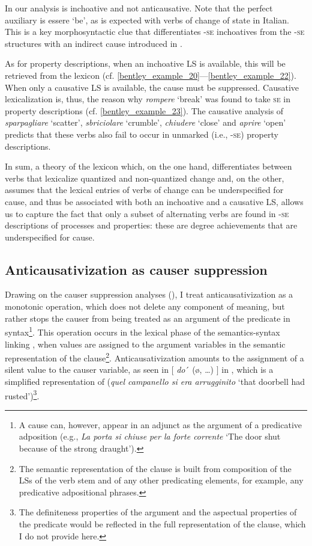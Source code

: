 \documentclass[output=paper,colorlinks,citecolor=brown
]{langscibook}
\begin{document}
In our analysis  is inchoative and not anticausative. Note that the perfect auxiliary is essere ‘be’, as is expected with verbs of change of state in Italian. This is a key morphosyntactic clue that differentiates -\textsc{se} inchoatives from the -\textsc{se} structures with an indirect cause introduced in . 

As for property descriptions, when an inchoative LS is available, this will be retrieved from the
lexicon (cf. \ref{bentley_example_20}—\ref{bentley_example_22}). When only a causative LS is available, the cause must be suppressed. Causative lexicalization is, thus, the reason why \textit{rompere} ‘break’ was found to take \textsc{se} in property descriptions (cf. \ref{bentley_example_23}). The causative analysis of \textit{sparpagliare} ‘scatter’, \textit{sbriciolare} ‘crumble’, \textit{chiudere} ‘close’ and \textit{aprire} ‘open’ predicts that these verbs also fail to occur in unmarked (i.e., -\textsc{se}) property descriptions.

In sum, a theory of the lexicon which, on the one hand, differentiates between verbs that lexicalize quantized and non-quantized change and, on the other, assumes that the lexical entries of verbs of change can be underspecified for cause, and thus be associated with both an inchoative and a causative LS, allows us to capture the fact that only a subset of alternating verbs are found in -\textsc{se} descriptions of processes and properties: these are degree achievements that are underspecified for cause.

\subsection{Anticausativization as causer suppression}
\label{bentley_section_5.4}

Drawing on the causer suppression analyses (), I treat anticausativization as a monotonic
operation, which does not delete any component of meaning, but rather stops the causer from being
treated as an argument of the predicate in syntax\footnote{A cause can, however, appear in an
  adjunct as the argument of a predicative adposition (e.g., \textit{La porta si chiuse per la forte
    corrente} ‘The door shut because of the strong draught’). }.  This operation occurs in the
lexical phase of the semantics-syntax linking \citep[116—125]{vanvalin2023principles}, when values
are assigned to the argument variables in the semantic representation of the clause\footnote{The
  semantic representation of the clause is built from composition of the LSs of the verb stem and of
  any other predicating elements, for example, any predicative adpositional
  phrases.}. Anticausativization amounts to the assignment of a silent value to the causer variable,
as seen in $\lbrack$ \textit{do}´ (\o,  \ldots ) $\rbrack$ in , which is a simplified representation of  (\textit{quel campanello si era arrugginito} ‘that doorbell had rusted’)\footnote{The definiteness properties of the argument and the aspectual properties of the predicate would be reflected in the full representation of the clause, which I do not provide here.}.
\end{document}
